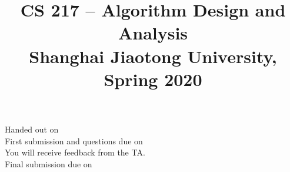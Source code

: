 \date{}

\title{CS 217 -- Algorithm Design and Analysis \\ 
  \vspace{3mm}
{\large	Shanghai Jiaotong University, Spring 2020\\
}
}
\maketitle

\noindent
Handed out on \handoutdate{}\\
First submission and questions due on \firstduedate{}\\
You will receive feedback from the TA.\\
Final submission due on \finalduedate{}
